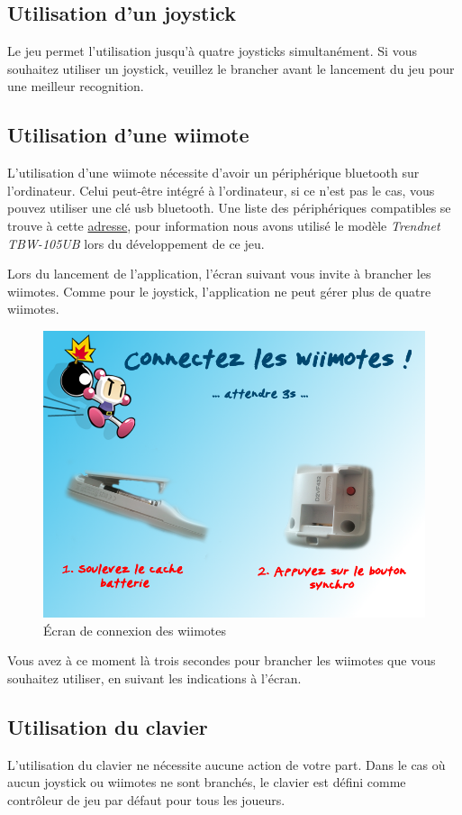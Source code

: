 \subsection{Utilisation d'un joystick}
	Le jeu permet l'utilisation jusqu'à quatre joysticks simultanément. Si vous souhaitez utiliser un joystick, veuillez le brancher avant le lancement du jeu pour une meilleur recognition.
	
\subsection{Utilisation d'une wiimote}

	L'utilisation d'une wiimote nécessite d'avoir un périphérique bluetooth sur l'ordinateur. Celui peut-être intégré à l'ordinateur, si ce n'est pas le cas, vous pouvez utiliser une clé usb bluetooth. Une liste des périphériques compatibles se trouve à cette \href{http://wiibrew.org/wiki/List_of_Working_Bluetooth_Devices}{adresse}, pour information nous avons utilisé le modèle \textit{Trendnet TBW-105UB} lors du développement de ce jeu.
	
	
	Lors du lancement de l'application, l'écran suivant vous invite à brancher les wiimotes. Comme pour le joystick, l'application ne peut gérer plus de quatre wiimotes.


\begin{figure}[h]
	\begin{center}
		\includegraphics[scale=0.5]{images/wiiScreen.png}
		\caption{Écran de connexion des wiimotes}
	\end{center}
\end{figure}


		
	Vous avez à ce moment là trois secondes pour brancher les wiimotes que vous souhaitez utiliser, en suivant les indications à l'écran.
	

\subsection{Utilisation du clavier}

L'utilisation du clavier ne nécessite aucune action de votre part. Dans le cas où aucun joystick ou wiimotes ne sont branchés, le clavier est défini comme contrôleur de jeu par défaut pour tous les joueurs.